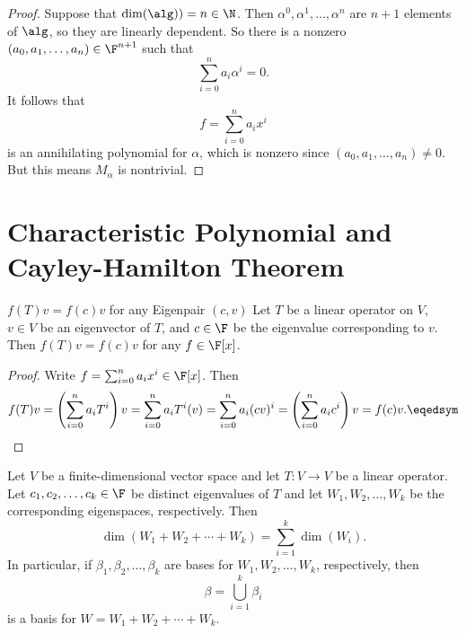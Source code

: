 \documentclass[linearalgebraII]{subfiles}
\begin{document}
    \begin{proof}
        Suppose that $\dim(\alg)) = n\in \N$. Then $\alpha^0, \alpha^1, \ldots, \alpha^n$ are $n+1$ elements of $\alg$, so they are linearly dependent. So there is a nonzero $\left( a_0, a_1, \ldots, a_n \right) \in \F^{n+1}$ such that
        \begin{equation*}
            \sum^{n}_{i=0} a_i\alpha^i = 0.
        \end{equation*}
        It follows that
        \begin{equation*}
            f = \sum^{n}_{i=0} a_ix^i
        \end{equation*}
        is an annihilating polynomial for $\alpha$, which is nonzero since $\left( a_0, a_1, \ldots, a_n \right)\neq 0$. But this means $M_\alpha$ is nontrivial.
    \end{proof}

    \section{Characteristic Polynomial and Cayley-Hamilton Theorem}

    \begin{lemma}{$f(T)v = f(c)v$ for any Eigenpair $(c,v)$}
        Let $T$ be a linear operator on $V$, $v\in V$ be an eigenvector of $T$, and $c\in \F$ be the eigenvalue corresponding to $v$. Then $f(T)v = f(c)v$ for any $f\in \F[x]$.
    \end{lemma}

    \begin{proof}
        Write $f = \sum^{n}_{i=0} a_ix^i \in \F[x]$. Then
        \begin{equation*}
            f(T)v = \left( \sum^{n}_{i=0} a_iT^i \right) v = \sum^{n}_{i=0} a_iT^i(v) = \sum^{n}_{i=0} a_i(cv)^i = \left( \sum^{n}_{i=0} a_ic^i \right) v = f(c)v. \eqedsym
        \end{equation*}
    \end{proof}

    \clearpage
    \begin{lemma}{}
        Let $V$ be a finite-dimensional vector space and let $T:V\to V$ be a linear operator. Let $c_1, c_2, \ldots, c_k\in \F$ be distinct eigenvalues of $T$ and let $W_1, W_2, \ldots, W_k$ be the corresponding eigenspaces, respectively. Then
        \begin{equation*}
            \dim \left( W_1 + W_2 + \cdots + W_k \right) = \sum^{k}_{i=1} \dim(W_i). 
        \end{equation*}
        In particular, if $\beta_1, \beta_2, \ldots, \beta_k$ are bases for $W_1, W_2, \ldots, W_k$, respectively, then
        \begin{equation*}
            \beta = \bigcup^{k}_{i=1} \beta_i
        \end{equation*}
        is a basis for $W = W_1 + W_2 + \cdots + W_k$.
    \end{lemma}
\end{document}
